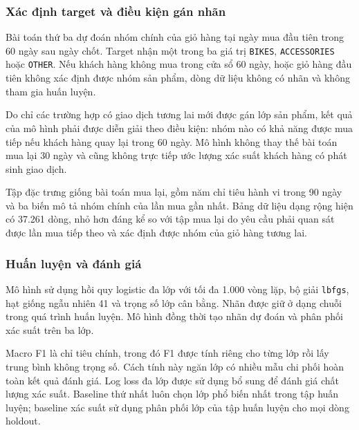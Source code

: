 \subsubsection{Xác định target và điều kiện gán nhãn}

Bài toán thứ ba dự đoán nhóm chính của giỏ hàng tại ngày mua đầu tiên trong 60 ngày sau ngày chốt. Target nhận một trong ba giá trị \texttt{BIKES}, \texttt{ACCESSORIES} hoặc \texttt{OTHER}. Nếu khách hàng không mua trong cửa sổ 60 ngày, hoặc giỏ hàng đầu tiên không xác định được nhóm sản phẩm, dòng dữ liệu không có nhãn và không tham gia huấn luyện.

Do chỉ các trường hợp có giao dịch tương lai mới được gán lớp sản phẩm, kết quả của mô hình phải được diễn giải theo điều kiện: nhóm nào có khả năng được mua tiếp nếu khách hàng quay lại trong 60 ngày. Mô hình không thay thế bài toán mua lại 30 ngày và cũng không trực tiếp ước lượng xác suất khách hàng có phát sinh giao dịch.

Tập đặc trưng giống bài toán mua lại, gồm năm chỉ tiêu hành vi trong 90 ngày và ba biến mô tả nhóm chính của lần mua gần nhất. Bảng dữ liệu dạng rộng hiện có 37.261 dòng, nhỏ hơn đáng kể so với tập mua lại do yêu cầu phải quan sát được lần mua tiếp theo và xác định được nhóm của giỏ hàng tương lai.

\subsubsection{Huấn luyện và đánh giá}

Mô hình sử dụng hồi quy logistic đa lớp với tối đa 1.000 vòng lặp, bộ giải \texttt{lbfgs}, hạt giống ngẫu nhiên 41 và trọng số lớp cân bằng. Nhãn được giữ ở dạng chuỗi trong quá trình huấn luyện. Mô hình đồng thời tạo nhãn dự đoán và phân phối xác suất trên ba lớp.

Macro F1 là chỉ tiêu chính, trong đó F1 được tính riêng cho từng lớp rồi lấy trung bình không trọng số. Cách tính này ngăn lớp có nhiều mẫu chi phối hoàn toàn kết quả đánh giá. Log loss đa lớp được sử dụng bổ sung để đánh giá chất lượng xác suất. Baseline thứ nhất luôn chọn lớp phổ biến nhất trong tập huấn luyện; baseline xác suất sử dụng phân phối lớp của tập huấn luyện cho mọi dòng holdout.

